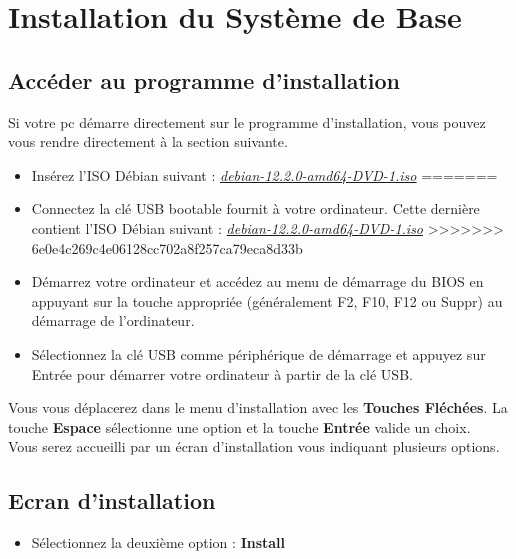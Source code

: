 \chapter{Installation du Système de Base}

\section{Accéder au programme d'installation}

Si votre pc démarre directement sur le programme d'installation, vous pouvez vous rendre directement à la section suivante.

\begin{itemize}
<<<<<<< HEAD
\item Insérez l'ISO Débian suivant : \textit{\href{https://cdimage.debian.org/debian-cd/current/amd64/iso-dvd/debian-12.2.0-amd64-DVD-1.iso}{debian-12.2.0-amd64-DVD-1.iso}}
=======
\item Connectez la clé USB bootable fournit à votre ordinateur. Cette dernière contient l'ISO Débian suivant : \textit{\href{https://cdimage.debian.org/debian-cd/current/amd64/iso-dvd/debian-12.2.0-amd64-DVD-1.iso}{debian-12.2.0-amd64-DVD-1.iso}}
>>>>>>> 6e0e4c269c4e06128cc702a8f257ca79eca8d33b
\item Démarrez votre ordinateur et accédez au menu de démarrage du BIOS en appuyant sur la touche appropriée (généralement F2, F10, F12 ou Suppr) au démarrage de l'ordinateur.
\item Sélectionnez la clé USB comme périphérique de démarrage et appuyez sur Entrée pour démarrer votre ordinateur à partir de la clé USB.\\
\end{itemize}

Vous vous déplacerez dans le menu d'installation avec les \textbf{Touches Fléchées}. La touche \textbf{Espace} sélectionne une option et la touche \textbf{Entrée} valide un choix.\\

Vous serez accueilli par un écran d'installation vous indiquant plusieurs options.

\section{Ecran d'installation}
\begin{itemize}
	\item Sélectionnez la deuxième option : \textbf{Install}
\end{itemize}

